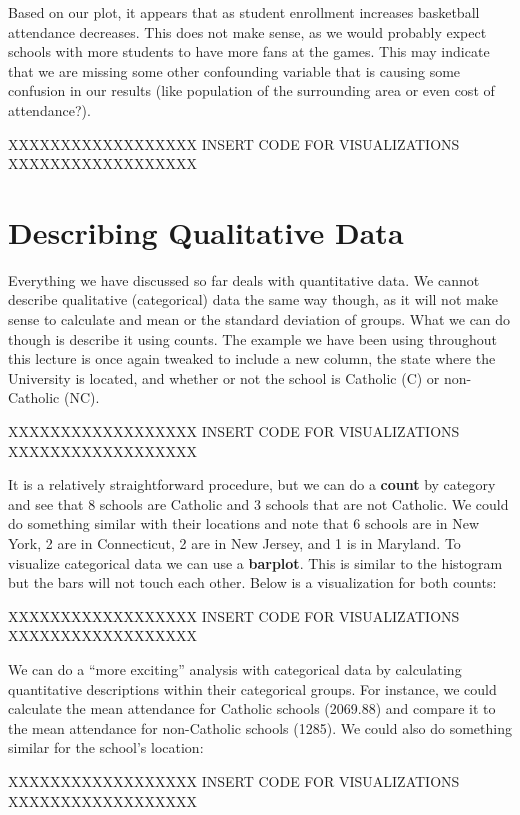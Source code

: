 \documentclass[
  letterpaper,
  DIV=11,
  numbers=noendperiod]{scrreprt}
\begin{document}
Based on our plot, it appears that as student enrollment increases
basketball attendance decreases. This does not make sense, as we would
probably expect schools with more students to have more fans at the
games. This may indicate that we are missing some other confounding
variable that is causing some confusion in our results (like population
of the surrounding area or even cost of attendance?).

XXXXXXXXXXXXXXXXXX INSERT CODE FOR VISUALIZATIONS XXXXXXXXXXXXXXXXXX

\section{Describing Qualitative Data}\label{describing-qualitative-data}

Everything we have discussed so far deals with quantitative data. We
cannot describe qualitative (categorical) data the same way though, as
it will not make sense to calculate and mean or the standard deviation
of groups. What we can do though is describe it using counts. The
example we have been using throughout this lecture is once again tweaked
to include a new column, the state where the University is located, and
whether or not the school is Catholic (C) or non-Catholic (NC).

XXXXXXXXXXXXXXXXXX INSERT CODE FOR VISUALIZATIONS XXXXXXXXXXXXXXXXXX

It is a relatively straightforward procedure, but we can do a
\textbf{count} by category and see that 8 schools are Catholic and 3
schools that are not Catholic. We could do something similar with their
locations and note that 6 schools are in New York, 2 are in Connecticut,
2 are in New Jersey, and 1 is in Maryland. To visualize categorical data
we can use a \textbf{barplot}. This is similar to the histogram but the
bars will not touch each other. Below is a visualization for both
counts:

XXXXXXXXXXXXXXXXXX INSERT CODE FOR VISUALIZATIONS XXXXXXXXXXXXXXXXXX

We can do a ``more exciting'' analysis with categorical data by
calculating quantitative descriptions within their categorical groups.
For instance, we could calculate the mean attendance for Catholic
schools (2069.88) and compare it to the mean attendance for non-Catholic
schools (1285). We could also do something similar for the school's
location:

XXXXXXXXXXXXXXXXXX INSERT CODE FOR VISUALIZATIONS XXXXXXXXXXXXXXXXXX
\end{document}

